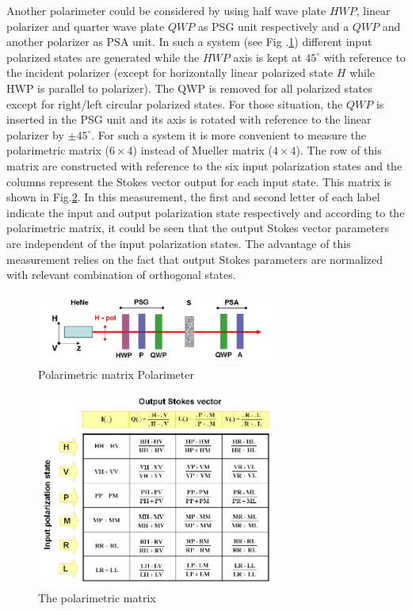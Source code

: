 \documentclass[oneside,a4,12p]{report} %
\begin{document}
Another polarimeter could be considered by using half wave plate $HWP$, linear polarizer and quarter wave plate $QWP$ as PSG unit respectively and a $QWP$ and another polarizer as PSA unit. In such a system (see Fig .\ref{fig:HWPQWPPQWPP}) different input polarized states are generated while the $HWP$ axis is kept at $45^{\circ}$ with reference to the incident polarizer (except for horizontally linear polarized state $H$ while HWP is parallel to polarizer). The QWP is removed for all polarized states except for right/left circular polarized states. For those situation, the $QWP$ is inserted in the PSG unit and its axis is rotated with reference to the linear polarizer by $\pm 45^{\circ}$. For such a system it is more convenient to measure the polarimetric matrix ($6\times4$) instead of Mueller matrix ($4\times4$). The row of this matrix are constructed with reference to the six input polarization states and the columns represent the Stokes vector output for each input state. This matrix is shown in Fig.\ref{fig:PolarimetricMatrix}. In this measurement, the first and second letter of each label indicate the input and output polarization state respectively and according to the polarimetric matrix, it could be seen that the output Stokes vector parameters are independent of the input polarization states. The advantage of this measurement relies on the fact that output Stokes parameters are normalized with relevant combination of orthogonal states. \\
 
	\begin{figure} [h]
	\centering 
	\includegraphics[width = 0.7\textwidth]{figures/HWPPQWP.png}	
	\caption{ Polarimetric matrix Polarimeter \cite{antonelli2011biomedical} }
	\label{fig:HWPQWPPQWPP}
	\end{figure}
	
	
	\begin{figure} [h]
	\centering 
	\includegraphics[width = 0.7\textwidth]{figures/PolarimetricMatrix.png}	
	\caption{ The polarimetric matrix\cite{antonelli2011biomedical} }
	\label{fig:PolarimetricMatrix}
	\end{figure}
\end{document}
